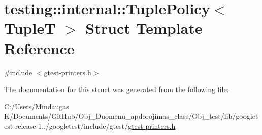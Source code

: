 \hypertarget{structtesting_1_1internal_1_1_tuple_policy}{}\section{testing\+::internal\+::Tuple\+Policy$<$ TupleT $>$ Struct Template Reference}
\label{structtesting_1_1internal_1_1_tuple_policy}


{\ttfamily \#include $<$gtest-\/printers.\+h$>$}



The documentation for this struct was generated from the following file\+:\begin{DoxyCompactItemize}
\item 
C\+:/\+Users/\+Mindaugas K/\+Documents/\+Git\+Hub/\+Obj\+\_\+\+Duomenu\+\_\+apdorojimas\+\_\+class/\+Obj\+\_\+test/lib/googletest-\/release-\/1../googletest/include/gtest/\mbox{\hyperlink{_obj__test_2lib_2googletest-release-1_88_81_2googletest_2include_2gtest_2gtest-printers_8h}{gtest-\/printers.\+h}}\end{DoxyCompactItemize}
